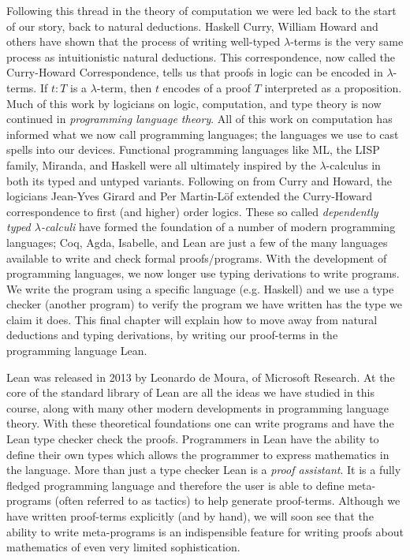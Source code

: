 \documentclass{book}
\begin{document}
        Following this thread in the theory of computation we were led back to the start of our story, back to natural deductions. Haskell Curry, William Howard and others have shown that the process of writing well-typed $\lambda$-terms is the very same process as intuitionistic natural deductions. This correspondence, now called the Curry-Howard Correspondence, tells us that proofs in logic can be encoded in $\lambda$-terms. If $t : T$ is a $\lambda$-term, then $t$ encodes of a proof $T$ interpreted as a proposition. Much of this work by logicians on logic, computation, and type theory is now continued in \emph{programming language theory}. All of this work on computation has informed what we now call programming languages; the languages we use to cast spells into our devices. Functional programming languages like ML, the LISP family, Miranda, and Haskell were all ultimately inspired by the  $\lambda$-calculus in both its typed and untyped variants. Following on from Curry and Howard, the logicians Jean-Yves Girard and Per Martin-L\"{o}f extended the Curry-Howard correspondence to first (and higher) order logics. These so called \emph{dependently typed $\lambda$-calculi} have formed the foundation of a number of modern programming languages; Coq, Agda, Isabelle, and Lean are just a few of the many languages available to write and check formal proofs/programs. With the development of programming languages, we now longer use typing derivations to write programs. We write the program using a specific language (e.g. Haskell) and we use a type checker (another program) to verify the program we have written has the type we claim it does. This final chapter will explain how to move away from natural deductions and typing derivations, by writing our proof-terms in the programming language Lean. 

        Lean was released in 2013 by Leonardo de Moura, of Microsoft Research. At the core of the standard library of Lean are all the ideas we have studied in this course, along with many other modern developments in programming language theory. With these theoretical foundations one can write programs and have the Lean type checker check the proofs. Programmers in Lean have the ability to define their own types which allows the programmer to express mathematics in the language. More than just a type checker Lean is a \emph{proof assistant}. It is a fully fledged programming language and therefore the user is able to define meta-programs (often referred to as tactics) to help generate proof-terms. Although we have written proof-terms explicitly (and by hand), we will soon see that the ability to write meta-programs is an indispensible feature for writing proofs about mathematics of even very limited sophistication. 
\end{document}
